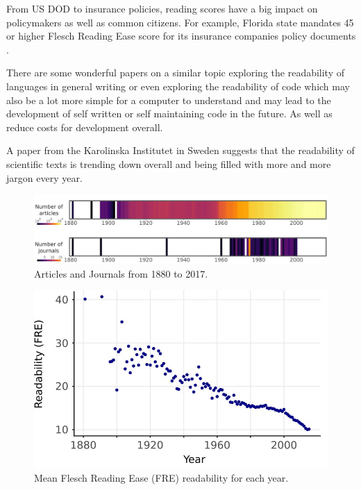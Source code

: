 \documentclass[letterpaper]{article}
\begin{document}
\par
From US DOD to insurance policies, reading scores have a big impact on policymakers as well as common citizens. For example, Florida state mandates 45 or higher Flesch Reading Ease score for its insurance companies policy documents \parencite[]{florida}.
\par
There are some wonderful papers on a similar topic exploring the readability of languages in general writing or even exploring the readability of code which may also be a lot more simple for a computer to understand and may lead to the development of self written or self maintaining code in the future. As well as reduce costs for development overall. \parencite[]{readable_code}
\par
A paper from the Karolinska Institutet in Sweden suggests that the readability of scientific texts is trending down overall and being filled with more and more jargon every year.\parencite[]{read_down}
\begin{figure}[h!]
  \centering
  \includegraphics[width=400pt]{images/articles_up.png}
  \caption{Articles and Journals from 1880 to 2017. \parencite[]{read_down}}
  \label{fig:stdlift}
\end{figure}
\begin{figure}[h!]
  \centering
  \includegraphics[width=400pt]{images/read_down.png}
  \caption{Mean Flesch Reading Ease (FRE) readability for each year. \parencite[]{read_down}}
  \label{fig:stdlift}
\end{figure}
\end{document}
